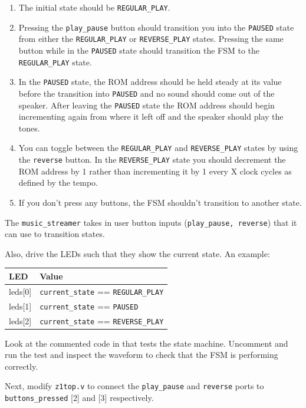 \documentclass[11pt]{article}
\newcommand*\ttvar[1]{\texttt{\expandafter\dottvar\detokenize{#1}\relax}}
\newcommand*\dottvar[1]{\ifx\relax#1\else
  \expandafter\ifx\string_#1\string_\allowbreak\else#1\fi
  \expandafter\dottvar\fi}
\begin{document}
\begin{enumerate}
  \item The initial state should be \verb|REGULAR_PLAY|.
  \item Pressing the \verb|play_pause| button should transition you into the \verb|PAUSED| state from either the \verb|REGULAR_PLAY| or \verb|REVERSE_PLAY| states. Pressing the same button while in the \verb|PAUSED| state should transition the FSM to the \verb|REGULAR_PLAY| state.
  \item In the \verb|PAUSED| state, the ROM address should be held steady at its value before the transition into \verb|PAUSED| and no sound should come out of the speaker. After leaving the \verb|PAUSED| state the ROM address should begin incrementing again from where it left off and the speaker should play the tones.
  \item You can toggle between the \verb|REGULAR_PLAY| and \verb|REVERSE_PLAY| states by using the \verb|reverse| button. In the \verb|REVERSE_PLAY| state you should decrement the ROM address by 1 rather than incrementing it by 1 every X clock cycles as defined by the tempo.
  \item If you don't press any buttons, the FSM shouldn't transition to another state.
\end{enumerate}

The \verb|music_streamer| takes in user button inputs (\verb|play_pause, reverse|) that it can use to transition states.

Also, drive the LEDs such that they show the current state. An example:
\renewcommand{\arraystretch}{1.5}
\begin{center}
\begin{tabular}{| l | l |}
  \hline
  \textbf{LED} & \textbf{Value} \\ \hline
      leds[0] & \verb|current_state| == \verb|REGULAR_PLAY| \\ \hline
      leds[1] & \verb|current_state| == \verb|PAUSED| \\ \hline
      leds[2] & \verb|current_state| == \verb|REVERSE_PLAY| \\ \hline
\end{tabular}
\end{center}

Look at the commented code in \ttvar{music_streamer_testbench.v} that tests the state machine.
Uncomment and run the test and inspect the waveform to check that the FSM is performing correctly.

Next, modify \verb|z1top.v| to connect the \verb|play_pause| and \verb|reverse| ports to \verb|buttons_pressed| [2] and [3] respectively.
\end{document}
